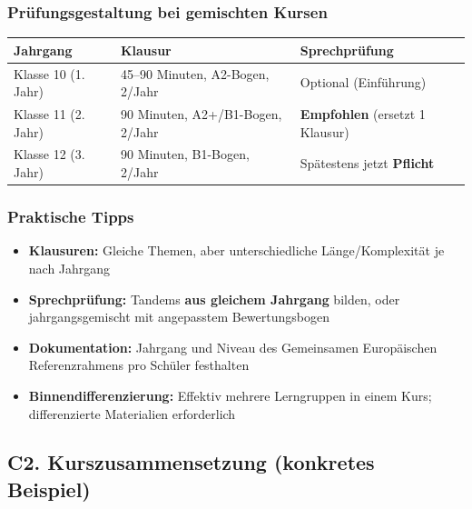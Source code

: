 \documentclass[10pt,a4paper]{article}
\begin{document}
\subsubsection{Prüfungsgestaltung bei gemischten Kursen}

\begin{center}
\small
\begin{tabular}{|p{2.5cm}|p{5cm}|p{5cm}|}
\hline
\rowcolor{lightgray}
\textbf{Jahrgang} & \textbf{Klausur} & \textbf{Sprechprüfung} \\
\hline
Klasse 10 (1. Jahr) & 45--90 Minuten, A2-Bogen, 2/Jahr & Optional (Einführung) \\
\hline
Klasse 11 (2. Jahr) & 90 Minuten, A2+/B1-Bogen, 2/Jahr & \textbf{Empfohlen} (ersetzt 1 Klausur) \\
\hline
Klasse 12 (3. Jahr) & 90 Minuten, B1-Bogen, 2/Jahr & Spätestens jetzt \textbf{Pflicht} \\
\hline
\end{tabular}
\end{center}

\subsubsection{Praktische Tipps}

\begin{itemize}[noitemsep]
\item \textbf{Klausuren:} Gleiche Themen, aber unterschiedliche Länge/Komplexität je nach Jahrgang
\item \textbf{Sprechprüfung:} Tandems \textbf{aus gleichem Jahrgang} bilden, oder jahrgangsgemischt mit angepasstem Bewertungsbogen
\item \textbf{Dokumentation:} Jahrgang und Niveau des Gemeinsamen Europäischen Referenzrahmens pro Schüler festhalten
\item \textbf{Binnendifferenzierung:} Effektiv mehrere Lerngruppen in einem Kurs; differenzierte Materialien erforderlich
\end{itemize}

\subsection{C2. Kurszusammensetzung (konkretes Beispiel)}
\end{document}
